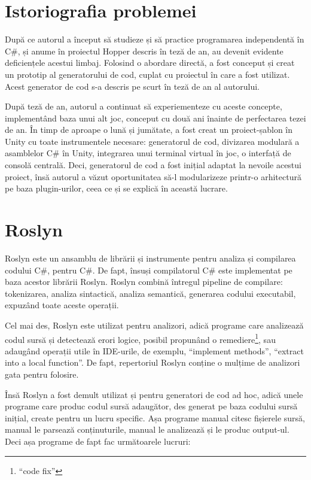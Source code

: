 \documentclass[a4paper,12pt]{report}
\begin{document}
\section{Istoriografia problemei}

După ce autorul a început să studieze și să practice programarea independentă în C\#, și anume în proiectul Hopper descris în teză de an, au devenit evidente deficiențele acestui limbaj.
Folosind o abordare directă, a fost conceput și creat un prototip al generatorului de cod, cuplat cu proiectul în care a fost utilizat.
Acest generator de cod s-a descris pe scurt în teză de an al autorului.

După teză de an, autorul a continuat să experiementeze cu aceste concepte, implementând baza unui alt joc, conceput cu două ani înainte de perfectarea tezei de an.
În timp de aproape o lună și jumătate, a fost creat un proiect-șablon în Unity cu toate instrumentele necesare: generatorul de cod, divizarea modulară a asamblelor C\# în Unity, integrarea unui terminal virtual în joc, o interfață de consolă centrală\cite{particular_project}.
Deci, generatorul de cod a fost inițial adaptat la nevoile acestui proiect, însă autorul a văzut oportunitatea să-l modularizeze printr-o arhitectură pe baza plugin-urilor, ceea ce și se explică în această lucrare.

\section{Roslyn}


Roslyn este un ansamblu de librării și instrumente pentru analiza și compilarea codului C\#, pentru C\#.
De fapt, însuși compilatorul C\# este implementat pe baza acestor librării Roslyn.
Roslyn combină întregul pipeline de compilare: tokenizarea, analiza sintactică, analiza semantică, generarea codului executabil, expuzând toate aceste operații.

Cel mai des, Roslyn este utilizat pentru analizori, adică programe care analizează codul sursă și detectează erori logice, posibil propunând o remediere\footnote{``code fix''}, sau adaugând operații utile în IDE-urile, de exemplu, ``implement methods'', ``extract into a local function''.
De fapt, repertoriul Roslyn conține o mulțime de analizori gata pentru folosire.

Însă Roslyn a fost demult utilizat și pentru generatori de cod ad hoc, adică unele programe care produc codul sursă adaugător, des generat pe baza codului sursă inițial, create pentru un lucru specific.
Așa programe manual citesc fișierele sursă, manual le parsează conținuturile, manual le analizează și le produc output-ul.
Deci așa programe de fapt fac următoarele lucruri:
\end{document}
